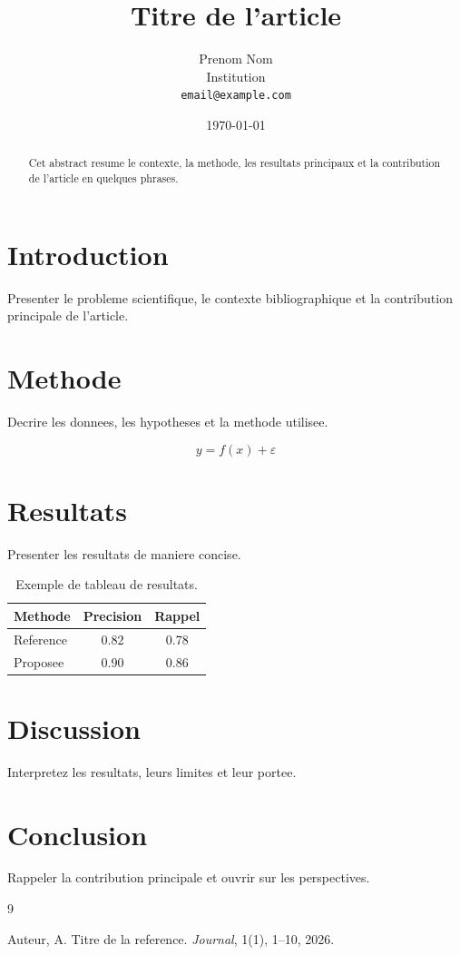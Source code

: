 \documentclass[11pt,a4paper]{article}
\title{Titre de l'article}
\author{Prenom Nom\\Institution\\\texttt{email@example.com}}
\date{\today}
\begin{document}
\maketitle

\begin{abstract}
Cet abstract resume le contexte, la methode, les resultats principaux et la contribution de l'article en quelques phrases.
\end{abstract}

\section{Introduction}

Presenter le probleme scientifique, le contexte bibliographique et la contribution principale de l'article.

\section{Methode}

Decrire les donnees, les hypotheses et la methode utilisee.

\begin{equation}
  y = f(x) + \varepsilon
\end{equation}

\section{Resultats}

Presenter les resultats de maniere concise.

\begin{table}[h]
  \centering
  \caption{Exemple de tableau de resultats.}
  \begin{tabular}{lcc}
    \toprule
    Methode & Precision & Rappel \\
    \midrule
    Reference & 0.82 & 0.78 \\
    Proposee & 0.90 & 0.86 \\
    \bottomrule
  \end{tabular}
  \label{tab:resultats}
\end{table}

\section{Discussion}

Interpretez les resultats, leurs limites et leur portee.

\section{Conclusion}

Rappeler la contribution principale et ouvrir sur les perspectives.

\begin{thebibliography}{9}

Auteur, A.
\newblock Titre de la reference.
\newblock \emph{Journal}, 1(1), 1--10, 2026.

\end{thebibliography}
\end{document}
